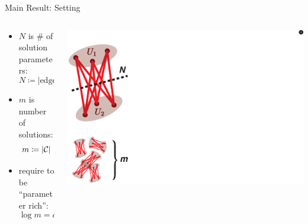 \documentclass[presentation,12pt]{beamer}
\def\C{{\cal C}}
\def\E{{\mathbb E}}
\begin{document}



\begin{frame}{Main Result: Setting}
\begin{columns}[T]
\begin{column}{0.6\textwidth}
  \begin{itemize}
  \item<+-> $N$ is $\#$ of solution parameters:
  \[
    N \coloneqq |\mathrm{edges}(U_1, U_2)|
  \]
  \item<+-> $m$ is number of solutions:
  \[
    m \coloneqq |\C|
  \]
  \item<+-> require to be ``parameter rich'':
  \[
    \log m = o(N)
  \]
  \end{itemize}
\end{column}
\begin{column}{0.4\textwidth}
\centering \includegraphics[scale=.8]{smbp_notation}


\vfill
\hbox{}
\end{column}
\end{columns}
\end{frame}
\end{document}

